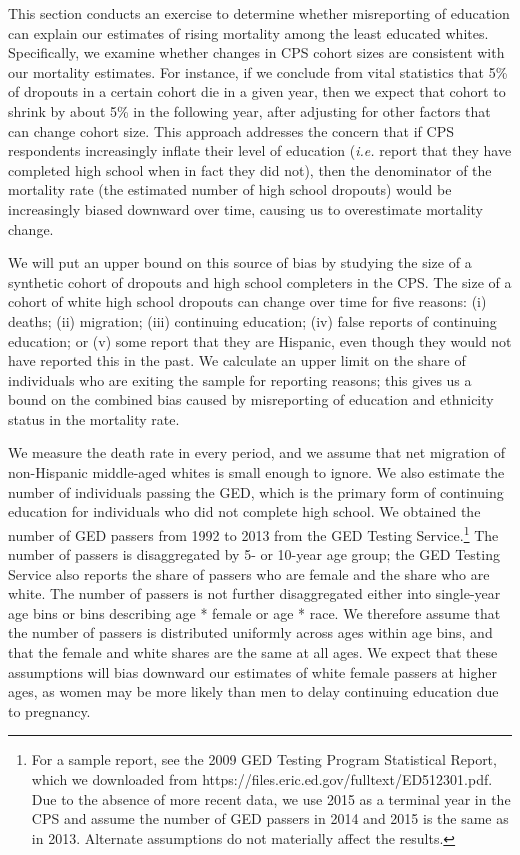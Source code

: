 This section conducts an exercise to determine whether misreporting of education can explain our estimates of rising mortality among the least educated whites. Specifically, we examine whether changes in CPS cohort sizes are consistent with our mortality estimates. For instance, if we conclude from vital statistics that 5\% of dropouts in a certain cohort die in a given year, then we expect that cohort to shrink by about 5\% in the following year, after adjusting for other factors that can change cohort size. This approach addresses the concern that if CPS respondents increasingly inflate their level of education (\textit{i.e.} report that they have completed high school when in fact they did not), then the denominator of the mortality rate (the estimated number of high school dropouts) would be increasingly biased downward over time, causing us to overestimate mortality change.

We will put an upper bound on this source of bias by studying the size of a synthetic cohort of dropouts and high school completers in the CPS. The size of a cohort of white high school dropouts can change over time for five reasons: (i) deaths; (ii) migration; (iii) continuing education; (iv) false reports of continuing education; or (v) some report that they are Hispanic, even though they would not have reported this in the past.  We calculate an upper limit on the share of individuals who are exiting the sample for reporting reasons; this gives us a bound on the combined bias caused by misreporting of education and ethnicity status in the mortality rate.

We measure the death rate in every period, and we assume that net migration of non-Hispanic middle-aged whites is small enough to ignore. We also estimate the number of individuals passing the GED, which is the primary form of continuing education for individuals who did not complete high school. We obtained the number of GED passers from 1992 to 2013 from the GED Testing Service.\footnote{For a sample report, see the 2009 GED Testing Program Statistical Report, which we downloaded from https://files.eric.ed.gov/fulltext/ED512301.pdf. Due to the absence of more recent data, we use 2015 as a terminal year in the CPS and assume the number of GED passers in 2014 and 2015 is the same as in 2013. Alternate assumptions do not materially affect the results.} The number of passers is disaggregated by 5- or 10-year age group; the GED Testing Service also reports the share of passers who are female and the share who are white. The number of passers is not further disaggregated either into single-year age bins or bins describing age * female or age * race. We therefore assume that the number of passers is distributed uniformly across ages within age bins, and that the female and white shares are the same at all ages. We expect that these assumptions will bias downward our estimates of white female passers at higher ages, as women may be more likely than men to delay continuing education due to pregnancy.

